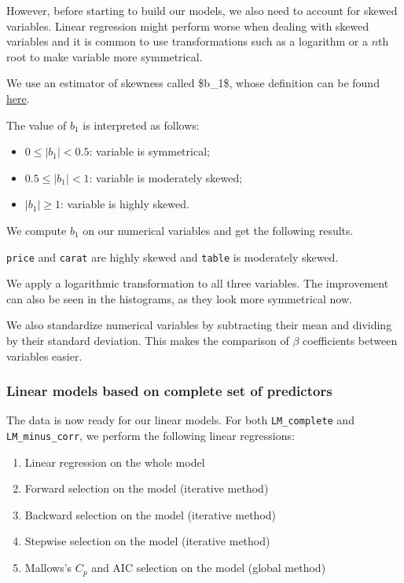 \documentclass[
  paper=a4,
  ,captions=tableheading
]{scrartcl}
\providecommand{\tightlist}{%
  \setlength{\itemsep}{0pt}\setlength{\parskip}{0pt}}
\begin{document}
However, before starting to build our models, we also need to account
for skewed variables. Linear regression might perform worse when dealing
with skewed variables and it is common to use transformations such as a
logarithm or a \(n\)th root to make variable more symmetrical.

We use an estimator of skewness called \$b\_1\$, whose definition can be
found
\href{https://en.wikipedia.org/wiki/Skewness\#Sample_skewness}{here}.

The value of \(b_1\) is interpreted as follows:

\begin{itemize}
\tightlist
\item
  \(0 \leq |b_1| < 0.5\): variable is symmetrical;
\item
  \(0.5 \leq |b_1| < 1\): variable is moderately skewed;
\item
  \(|b_1| \geq 1\): variable is highly skewed.
\end{itemize}

We compute \(b_1\) on our numerical variables and get the following
results.

\texttt{price} and \texttt{carat} are highly skewed and \texttt{table}
is moderately skewed.

We apply a logarithmic transformation to all three variables. The
improvement can also be seen in the histograms, as they look more
symmetrical now.

We also standardize numerical variables by subtracting their mean and
dividing by their standard deviation. This makes the comparison of
\(\beta\) coefficients between variables easier.

\hypertarget{linear-models-based-on-complete-set-of-predictors}{%
\subsubsection{Linear models based on complete set of
predictors}\label{linear-models-based-on-complete-set-of-predictors}}

The data is now ready for our linear models. For both
\texttt{LM\_complete} and \texttt{LM\_minus\_corr}, we perform the
following linear regressions:

\begin{enumerate}
\def\labelenumi{\arabic{enumi}.}
\tightlist
\item
  Linear regression on the whole model
\item
  Forward selection on the model (iterative method)
\item
  Backward selection on the model (iterative method)
\item
  Stepwise selection on the model (iterative method)
\item
  Mallows's \(C_p\) and AIC selection on the model (global method)
\end{enumerate}
\end{document}
